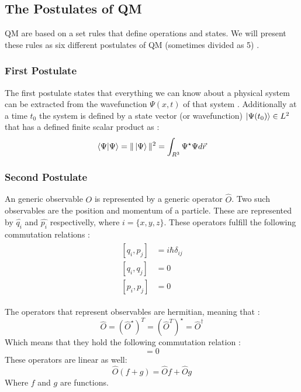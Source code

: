 \documentclass[../master_thesis.tex]{subfiles}
\begin{document}
\subsection{The Postulates of \ac{QM}}

\ac{QM} are based on a set rules that define operations and states. We will
present these rules as six different postulates of \ac{QM} (sometimes divided
as 5) \cite{Atkins:2011, Cohen:1973}.

\subsubsection{First Postulate}
The first postulate states that everything we can know about a physical system
can be extracted from the wavefunction $\Psi(x, t)$ of that system
\cite{Atkins:2011}. Additionally at a time $t_0$ the system is defined by
a state vector (or wavefunction) $\ket{\Psi(t_0)}\in L^2$ that has a defined
finite scalar product as \cite{Cohen:1973}:
\begin{equation}
  \braket{\Psi|\Psi} = \|\ket{\Psi}\|^2 =  \int_{R^3}\Psi^\star\Psi d\vec{r}
\end{equation}

\subsubsection{Second Postulate}
An generic observable $O$ is represented by a generic operator $\hat{O}$. Two
such observables are the position and momentum of a particle. These are
represented by $\hat{q_i}$ and $\hat{p_i}$ respectivelly, where
$i = \{x, y, z\}$. These operators fulfill the following commutation relations
\cite{Atkins:2011, Cohen:1973}:
\begin{align}
  \begin{split}
    [q_i, p_j] &= i \hbar \delta_{ij}\\
    [q_i, q_j] &= 0 \\
    [p_i, p_j] &= 0
  \end{split}
\end{align}

The operators that represent observables are hermitian, meaning that
\cite{Cohen:1973}:
\begin{equation}
  \hat{O} = (\hat{O}^{\star})^T = (\hat{O}^T)^{\star} = \hat{O}^{\dagger}
\end{equation}
Which means that they hold the following commutation relation
\cite{Cohen:1973}:
\begin{equation}
  [\hat{O}, \hat{O}^{\dagger}] = 0
\end{equation}
These operators are linear as well:
\begin{equation}
    \hat{O}(f + g) = \hat{O}f + \hat{O}g\label{eq:oplinearity}
\end{equation}
Where $f$ and $g$ are functions.
\end{document}
